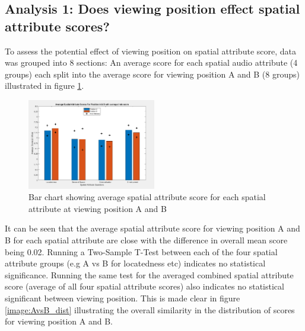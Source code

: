 















\subsection{Analysis 1: Does viewing position effect spatial attribute scores?}
	\label{ana1}

		To assess the potential effect of viewing position on spatial attribute score, data was grouped into 8 sections: An average score for each spatial audio attribute (4 groups) each split into the average score for viewing position A and B (8 groups) illustrated in figure \ref{image:AvsB}. \\

		\begin{figure}
			\includegraphics[width=0.5\textwidth]{images/plots/AvB_Bar_error.PNG}
			\caption{Bar chart showing average spatial attribute score for each spatial attribute at viewing position A and B}
			\label{image:AvsB} 
		\end{figure}

		It can be seen that the average spatial attribute score for viewing position A and B for each spatial attribute are close with the difference in overall mean score being 0.02. Running a Two-Sample T-Test between each of the four spatial attribute groups (e.g A vs B for locatedness etc) indicates no statistical significance. Running the same test for the averaged combined spatial attribute score (average of all four spatial attribute scores) also indicates no statistical significant between viewing position. This is made clear in figure \ref{image:AvsB_dist} illustrating the overall similarity in the distribution of scores for viewing position A and B. \\
		
